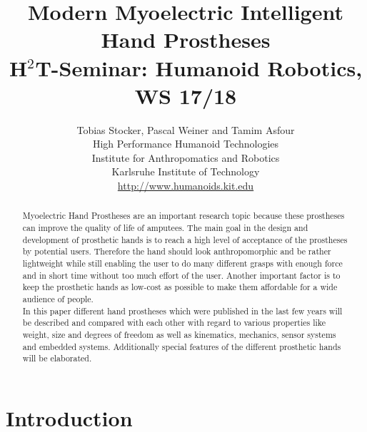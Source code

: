 \documentclass[a4paper, 10pt, conference]{ieeeconf}      %
\title{\bf {\LARGE Modern Myoelectric Intelligent Hand Prostheses} \\ 
{\normalsize H$^2$T-Seminar: Humanoid Robotics, WS 17/18}}
\author{Tobias Stocker, Pascal Weiner and Tamim Asfour \\ High Performance Humanoid Technologies \\ Institute for Anthropomatics and Robotics \\ Karlsruhe Institute of Technology \\
\url{http://www.humanoids.kit.edu}}
\begin{document}
\maketitle
\thispagestyle{empty}
\pagestyle{empty}
%
\begin{abstract}
Myoelectric Hand Prostheses are an important research topic because these prostheses can improve the quality of life of amputees. The main goal in the design and development of prosthetic hands is to reach a high level of acceptance of the prostheses by potential users. Therefore the hand should look anthropomorphic and be rather lightweight while still enabling the user to do many different grasps with enough force and in short time without too much effort of the user. Another important factor is to keep the prosthetic hands as low-cost as possible to make them affordable for a wide audience of people.\\
In this paper different hand prostheses which were published in the last few years will be described and compared with each other with regard to various properties like weight, size and degrees of freedom as well as kinematics, mechanics, sensor systems and embedded systems. Additionally special features of the different prosthetic hands will be elaborated.
\end{abstract}

\section{Introduction}
\end{document}

